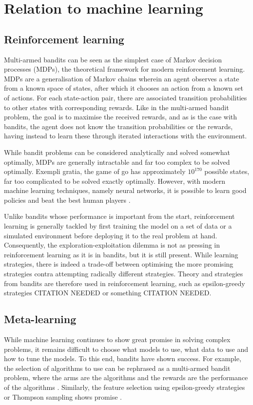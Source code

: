 \section{Relation to machine learning}
\subsection{Reinforcement learning}
Multi-armed bandits can be seen as the simplest case of Markov decision processes (MDPs), the theoretical framework for modern reinforcement learning.
MDPs are a generalisation of Markov chains wherein an agent observes a state from a known space of states, after which it chooses an action from a known set of actions.
For each state-action pair, there are associated transition probabilities to other states with corresponding rewards.
Like in the multi-armed bandit problem, the goal is to maximise the received rewards, and as is the case with bandits, the agent does not know the transition probabilities or the rewards, having instead to learn these through iterated interactions with the environment.

While bandit problems can be considered analytically and solved somewhat optimally, MDPs are generally intractable and far too complex to be solved optimally.
Exempli gratia, the game of go has approximately $10^{170}$ possible states, far too complicated to be solved exactly optimally.
However, with modern machine learning techniques, namely neural networks, it is possible to learn good policies and beat the best human players \autocite{silver2016}.

Unlike bandits whose performance is important from the start, reinforcement learning is generally tackled by first training the model on a set of data or a simulated environment before deploying it to the real problem at hand.
Consequently, the exploration-exploitation dilemma is not as pressing in reinforcement learning as it is in bandits, but it is still present.
While learning strategies, there is indeed a trade-off between optimising the more promising strategies contra attempting radically different strategies.
Theory and strategies from bandits are therefore used in reinforcement learning, such as epsilon-greedy strategies CITATION NEEDED or something CITATION NEEDED.


\subsection{Meta-learning}
While machine learning continues to show great promise in solving complex problems, it remains difficult to choose what models to use, what data to use and how to tune the models.
To this end, bandits have shown success.
For example, the selection of algorithms to use can be rephrased as a multi-armed bandit problem, where the arms are the algorithms and the rewards are the performance of the algorithms \autocite{gagliolo2010}.
Similarly, the feature selection using epsilon-greedy strategies \autocite{wang2014} or Thompson sampling shows promise \autocite{bouneffouf2017}.